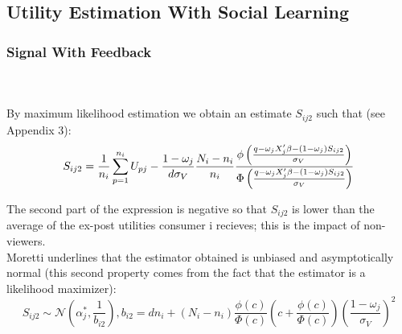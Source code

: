 	\subsection{Utility Estimation With Social Learning}	
	
	\subsubsection{Signal With Feedback}
	\\\\

	By maximum likelihood estimation we obtain an estimate $S_{i j 2}$ such that (see Appendix 3):
	\begin{equation}
	S_{i j 2}=\frac{1}{n_{i}}\sum_{p=1}^{n_{i}}U_{p j}-\frac{1-\omega_{j}}{d\sigma_{V}}\frac{N_{i}-n_{i}}{n_{i}}\frac{\phi\left(\frac{q-\omega_{j}X'_{j}\beta-(1-\omega_{j})S_{i j 2}}{\sigma_{V}}\right)}{\Phi\left(\frac{q-\omega_{j}X'_{j}\beta-(1-\omega_{j})S_{i j 2}}{\sigma_{V}}\right)}\\
	\end{equation}
	
	The second part of the expression is negative so that $S_{i j 2}$ is lower than the average of the ex-post utilities consumer i recieves; this is the impact of non-viewers.\\
	
	Moretti underlines that the estimator obtained is unbiased and asymptotically normal (this second property comes from the fact that the estimator is a likelihood maximizer): 
	\begin{equation}
	S_{i j 2}\sim\mathcal{N}(\alpha_{j}^{*}, \frac{1}{b_{i 2}}) , b_{i 2}=dn_{i}+(N_{i}-n_{i})\frac{\phi(c)}{\Phi(c)}\left(c+\frac{\phi(c)}{\Phi(c)}\right)(\frac{1-\omega_{j}}{\sigma_{V}})^{2}
	\end{equation}\\
	
